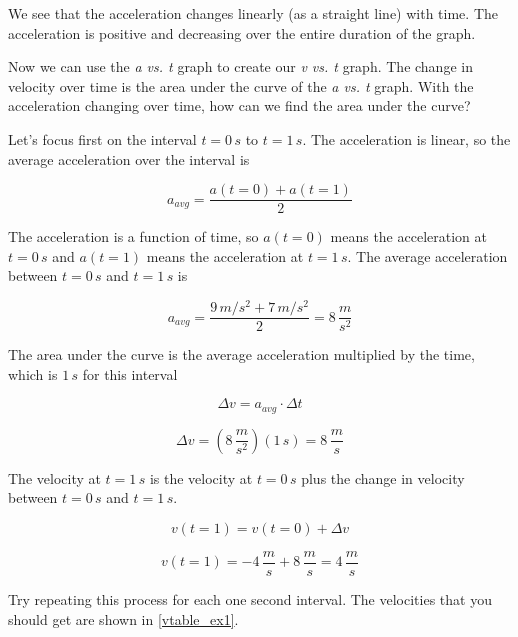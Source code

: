 \documentclass[12pt]{book}
\begin{document}
\begin{exampleblock}
We see that the acceleration changes linearly (as a straight line) with time. The acceleration is positive and decreasing over the entire duration of the graph.

Now we can use the \textit{a vs. t} graph to create our \textit{v vs. t} graph. The change in velocity over time is the area under the curve of the \textit{a vs. t} graph. With the acceleration changing over time, how can we find the area under the curve?

Let's focus first on the interval $t = 0 \, s$ to $t = 1 \, s$. The acceleration is linear, so the average acceleration over the interval is 

\begin{equation}
a_{avg} = \frac{a(t=0) + a(t=1)}{2}
\end{equation}

The acceleration is a function of time, so $a(t=0)$ means the acceleration at $t = 0 \, s$ and $a(t=1)$ means the acceleration at $t = 1 \, s$. The average acceleration between $t = 0 \, s$ and $t = 1 \, s$ is

\begin{equation}
a_{avg} = \frac{9 \, m/s^2 + 7 \, m/s^2}{2} = 8 \, \frac{m}{s^2}
\end{equation}

The area under the curve is the average acceleration multiplied by the time, which is $1 \, s$ for this interval

\begin{equation}
\Delta v = a_{avg} \cdot \Delta t
\end{equation}

\begin{equation}
\Delta v = (8 \, \frac{m}{s^2}) (1 \, s) = 8 \, \frac{m}{s}
\end{equation}

The velocity at $t = 1 \, s$ is the velocity at $t = 0 \, s$ plus the change in velocity between $t = 0 \, s$ and $t = 1 \, s$.

\begin{equation}
v(t=1) = v(t=0) + \Delta v
\end{equation}

\begin{equation}
v(t=1) = -4 \, \frac{m}{s} + 8 \, \frac{m}{s} = 4 \, \frac{m}{s}
\end{equation}

Try repeating this process for each one second interval. The velocities that you should get are shown in \ref{vtable_ex1}.


\end{exampleblock}
\end{document}
